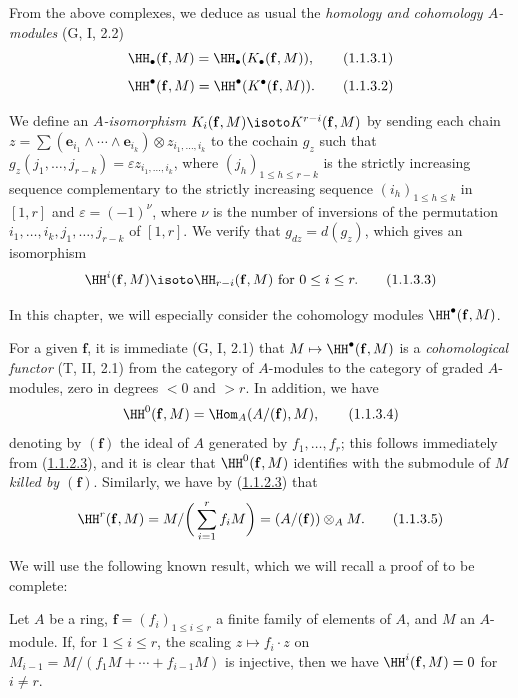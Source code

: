 \begin{env}[1.1.3]
\label{III.1.1.3}
From the above complexes, we deduce as usual the \emph{homology and cohomology $A$-modules} (G, I, 2.2)
\[
  \HH_\bullet(\mathbf{f},M)=\HH_\bullet(K_\bullet(\mathbf{f},M)),
  \tag{1.1.3.1}
\]
\[
  \HH^\bullet(\mathbf{f},M)=\HH^\bullet(K^\bullet(\mathbf{f},M)).
  \tag{1.1.3.2}
\]

We define an \emph{$A$-isomorphism $K_i(\mathbf{f},M)\isoto K^{r-i}(\mathbf{f},M)$} by sending each chain $z=\sum(\mathbf{e}_{i_1}\wedge\cdots\wedge\mathbf{e}_{i_k})\otimes z_{i_1,\dots,i_k}$ to the cochain $g_z$ such that $g_z(j_1,\dots,j_{r-k})=\varepsilon z_{i_1,\dots,i_k}$, where $(j_h)_{1\leq h\leq r-k}$ is the strictly increasing sequence complementary to the strictly increasing sequence $(i_h)_{1\leq h\leq k}$ in $[1,r]$ and $\varepsilon=(-1)^\nu$, where $\nu$ is the number of inversions of the permutation $i_1,\dots,i_k,j_1,\dots,j_{r-k}$ of $[1,r]$.
We verify that $g_{dz}=d(g_z)$, which gives an isomorphism
\[
  \HH^i(\mathbf{f},M)\isoto\HH_{r-i}(\mathbf{f},M)\text{ for }0\leq i\leq r.
  \tag{1.1.3.3}\label{III.1.1.3.3}
\]

In this chapter, we will especially consider the cohomology modules $\HH^\bullet(\mathbf{f},M)$.

For a given $\mathbf{f}$, it is immediate (G, I, 2.1) that $M\mapsto\HH^\bullet(\mathbf{f},M)$ is a \emph{cohomological functor} (T, II, 2.1) from the category of $A$-modules to the category of graded $A$-modules, zero in degrees $<0$ and $>r$.
In addition, we have
\[
  \HH^0(\mathbf{f},M)=\Hom_A(A/(\mathbf{f}),M),
  \tag{1.1.3.4}
\]
denoting by $(\mathbf{f})$ the ideal of $A$ generated by $f_1,\dots,f_r$; this follows immediately from (\hyperref[III.1.1.2.3]{1.1.2.3}), and it is clear that $\HH^0(\mathbf{f},M)$ identifies with the submodule of $M$ \emph{killed by $(\mathbf{f})$}.
Similarly, we have by (\hyperref[III.1.1.2.3]{1.1.2.3}) that
\[
  \HH^r(\mathbf{f},M)=M/\bigg(\sum_{i=1}^r f_i M\bigg)=(A/(\mathbf{f}))\otimes_A M.
  \tag{1.1.3.5}\label{III.1.1.3.5}
\]

We will use the following known result, which we will recall a proof of to be complete:
\end{env}

\begin{proposition}[1.1.4]
\label{III.1.1.4}
Let $A$ be a ring, $\mathbf{f}=(f_i)_{1\leq i\leq r}$ a finite family of elements of $A$, and $M$ an $A$-module.
If, for $1\leq i\leq r$, the scaling $z\mapsto f_i\cdot z$ on $M_{i-1}=M/(f_1 M+\cdots+f_{i-1}M)$ is injective, then we have $\HH^i(\mathbf{f},M)=0$ for $i\neq r$.
\end{proposition}

